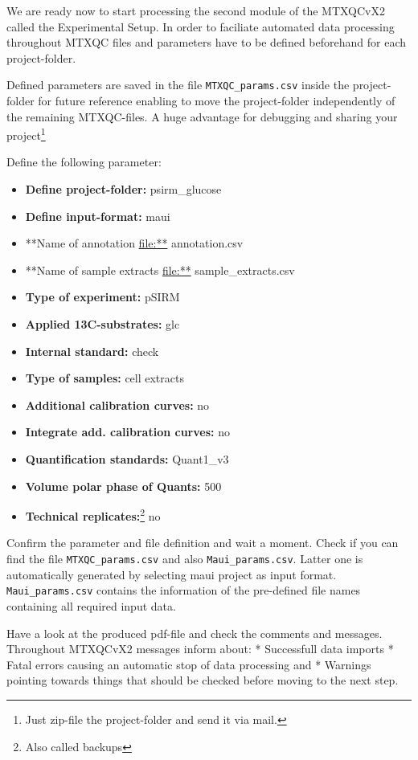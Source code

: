 \documentclass[]{book}
\providecommand{\tightlist}{%
  \setlength{\itemsep}{0pt}\setlength{\parskip}{0pt}}
\let\rmarkdownfootnote\footnote%
\def\footnote{\protect\rmarkdownfootnote}
\theoremstyle{definition}
\theoremstyle{definition}
\theoremstyle{definition}
\theoremstyle{remark}
\begin{document}
We are ready now to start processing the second module of the MTXQCvX2
called the Experimental Setup. In order to faciliate automated data
processing throughout MTXQC files and parameters have to be defined
beforehand for each project-folder.

Defined parameters are saved in the file \texttt{MTXQC\_params.csv}
inside the project-folder for future reference enabling to move the
project-folder independently of the remaining MTXQC-files. A huge
advantage for debugging and sharing your project\footnote{Just zip-file
  the project-folder and send it via mail.}

Define the following parameter:

\begin{itemize}
\tightlist
\item
  \textbf{Define project-folder:} psirm\_glucose
\item
  \textbf{Define input-format:} maui
\item
  **Name of annotation \url{file:**} annotation.csv
\item
  **Name of sample extracts \url{file:**} sample\_extracts.csv
\item
  \textbf{Type of experiment:} pSIRM
\item
  \textbf{Applied 13C-substrates:} glc
\item
  \textbf{Internal standard:} check
\item
  \textbf{Type of samples:} cell extracts
\item
  \textbf{Additional calibration curves:} no
\item
  \textbf{Integrate add. calibration curves:} no
\item
  \textbf{Quantification standards:} Quant1\_v3
\item
  \textbf{Volume polar phase of Quants:} 500
\item
  \textbf{Technical replicates:}\footnote{Also called backups} no
\end{itemize}

Confirm the parameter and file definition and wait a moment. Check if
you can find the file \texttt{MTXQC\_params.csv} and also
\texttt{Maui\_params.csv}. Latter one is automatically generated by
selecting maui project as input format. \texttt{Maui\_params.csv}
contains the information of the pre-defined file names containing all
required input data.

Have a look at the produced pdf-file and check the comments and
messages. Throughout MTXQCvX2 messages inform about: * Successfull data
imports * Fatal errors causing an automatic stop of data processing and
* Warnings pointing towards things that should be checked before moving
to the next step.
\end{document}
